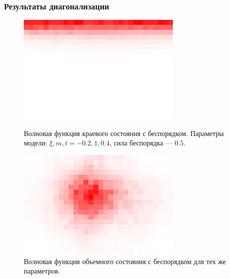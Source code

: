 \documentclass{beamer}
\begin{document}
\begin{frame}
    \frametitle{Результаты диагонализации}
    \begin{figure}[h]
        \centering
        \begin{minipage}[h]{0.4\linewidth}
            \includegraphics[width=1.\linewidth]{dis_edge_state_1.png}
            \caption{
                Волновая функция краевого состояния с беспорядком.
                Параметры модели: $\xi, m, t = -0.2, 1, 0.4$, сила беспорядка --- $0.5$.
                }
        \end{minipage}
        \hfill
        \begin{minipage}[h]{0.4\linewidth}
            \includegraphics[width=1.\linewidth]{dis_bulk_state.png}
            \caption{
                Волновая функция объемного состояния с беспорядком для тех же параметров.
                }
        \end{minipage}
        \label{fig:disordered_stripe}
    \end{figure}
\end{frame}
\end{document}
